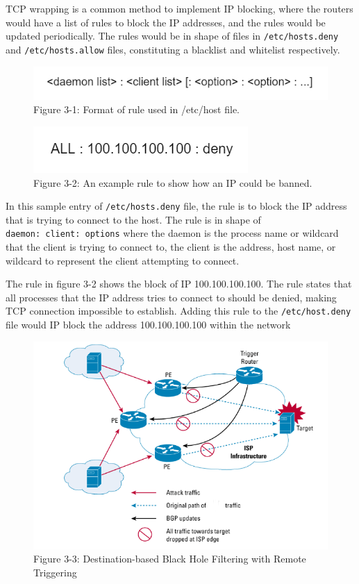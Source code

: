 \documentclass[sigconf]{acmart}
\begin{document}
TCP wrapping is a common method to implement IP blocking, where the
routers would have a list of rules to block the IP addresses, and the
rules would be updated periodically. The rules would be in shape of
files in \texttt{/etc/hosts.deny} and \texttt{/etc/hosts.allow} files,
constituting a blacklist and whitelist respectively.

\begin{figure}
\centering
\includegraphics{res/3.1-etc-host.jpg}
\caption{Figure 3-1: Format of rule used in /etc/host file.}
\end{figure}

\begin{figure}
\centering
\includegraphics{res/3.2-rule.png}
\caption{Figure 3-2: An example rule to show how an IP could be banned.}
\end{figure}

In this sample entry of \texttt{/etc/hosts.deny} file, the rule is to
block the IP address that is trying to connect to the host. The rule is
in shape of \texttt{daemon:\ client:\ options} where the daemon is the
process name or wildcard that the client is trying to connect to, the
client is the address, host name, or wildcard to represent the client
attempting to connect. \cite{12_hostman}

The rule in figure 3-2 shows the block of IP 100.100.100.100. The rule
states that all processes that the IP address tries to connect to should
be denied, making TCP connection impossible to establish. Adding this
rule to the \texttt{/etc/host.deny} file would IP block the address
100.100.100.100 within the network

\begin{figure}
\centering
\includegraphics{res/3-3-cisco.png}
\caption{Figure 3-3: Destination-based Black Hole Filtering with Remote
Triggering}
\end{figure}
\end{document}
